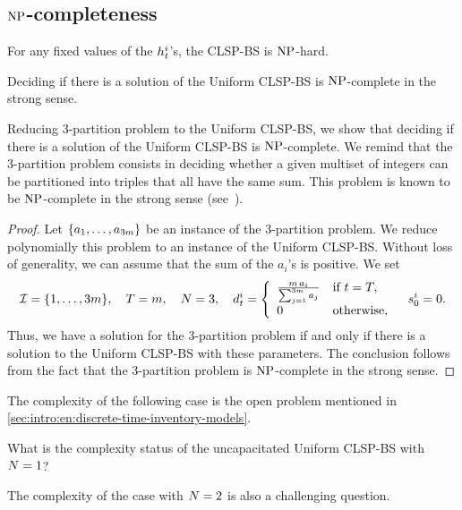 \subsection{$\operatorname{NP}$-completeness}
\label{sec:PDP:deterministic:theoretical-results:NP-completeness}


For any fixed values of the $h_t^i$'s, the CLSP-BS is $\operatorname{NP}$-hard.


\begin{thm}
  Deciding if there is a solution of the Uniform CLSP-BS is $\operatorname{NP}$-complete in the strong sense.
\end{thm}


Reducing 3-partition problem to the Uniform CLSP-BS, we show that deciding if there is a solution of the Uniform CLSP-BS is $\operatorname{NP}$-complete.
We remind that the 3-partition problem consists in deciding whether a given multiset of integers can be partitioned into triples that all have the same sum.
This problem is known to be $\operatorname{NP}$-complete in the strong sense (see~\citet{Garey1979}).


\begin{proof}
Let $\crbracket{a_1,\ldots,a_{3m}}$ be an instance of the 3-partition problem.
We reduce polynomially this problem to an instance of the Uniform CLSP-BS.
Without loss of generality, we can assume that the sum of the $a_i$'s is positive.
We set
\begin{equation}
  \REF=\range[1]{3m}
  ,\quad
  \horizon=m
  ,\quad
  \nbsetups=3
  ,\quad
  \demand_t^i
  =\left\{
  \begin{array}{ll}
  \frac{m\,a_i}{\sum_{j=1}^{3m}a_j} & \mbox{if}\ t=\horizon,
  \\
  0 & \mbox{otherwise,}\end{array}
  \right.
  \quad
  \inventory_0^i=0.
\end{equation}
Thus, we have a solution for the 3-partition problem if and only if there is a solution to the Uniform CLSP-BS with these parameters.
The conclusion follows from the fact that the 3-partition problem is $\operatorname{NP}$-complete in the strong sense.
\end{proof}


The complexity of the following case is the open problem mentioned in \cref{sec:intro:en:discrete-time-inventory-models}.
\begin{question}
What is the complexity status of the uncapacitated Uniform CLSP-BS with $N=1$?
\end{question}
The complexity of the case with $N=2$ is also a challenging question.


